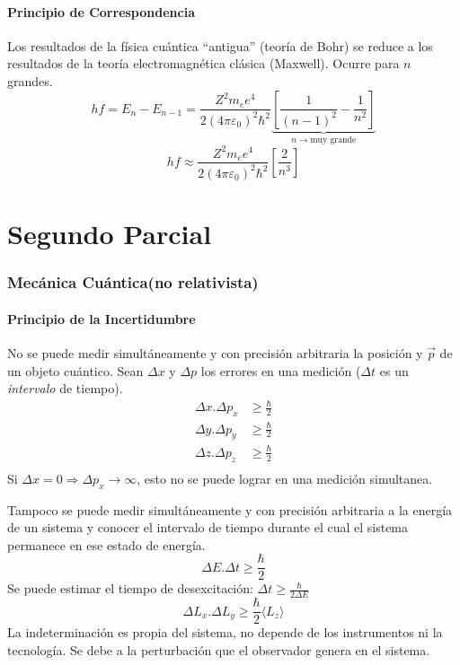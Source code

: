 \documentclass[10pt,twocolumn,titlepage]{article}
\begin{document}
\subsection{Principio de Correspondencia}
Los resultados de la física cuántica ``antigua'' (teoría de Bohr) se reduce a los resultados de la teoría electromagnética clásica (Maxwell). Ocurre para $n$ grandes.
$$hf=E_n-E_{n-1}=\frac{Z^2m_e e^4}{2(4\pi\varepsilon_0)^2\hbar^2}\underbrace{\left[ \frac{1}{(n-1)^2} - \frac{1}{n^2}\right]}_{n\rightarrow\textrm{muy grande}} $$
$$hf\approx \frac{Z^2m_e e^4}{2(4\pi\varepsilon_0)^2\hbar^2}\left[ \frac{2}{n^3} \right] $$
\clearpage
\part{Segundo Parcial}
\section{Mecánica Cuántica(no relativista)}
\subsection{Principio de la Incertidumbre}
No se puede medir simultáneamente y con precisión arbitraria la posición y $\vec{p}$ de un objeto cuántico. Sean $\Delta x$ y $\Delta p$ los errores en una medición ($\Delta t$ es un \emph{intervalo} de tiempo).
\begin{align*}
\Delta x. \Delta p_x&\geq \frac{\hbar}{2} \\
\Delta y. \Delta p_y&\geq \frac{\hbar}{2} \\
\Delta z. \Delta p_z&\geq \frac{\hbar}{2} \\
\end{align*}
Si $\Delta x =0 \Rightarrow \Delta p_x\rightarrow \infty$, esto no se puede lograr en una medición simultanea.\par
Tampoco se puede medir simultáneamente y con precisión arbitraria a la energía de un sistema y conocer el intervalo de tiempo durante el cual el sistema permanece en ese estado de energía.
$$\Delta E. \Delta t \geq \frac{\hbar}{2} $$
Se puede estimar el tiempo de desexcitación: $\Delta t \geq \frac{\hbar}{2\Delta E}$ 
$$\Delta L_x.\Delta L_y \geq \frac{\hbar}{2} \langle L_z\rangle$$
La indeterminación es propia del sistema, no depende de los instrumentos ni la tecnología. Se debe a la perturbación que el observador genera en el sistema.
\end{document}
